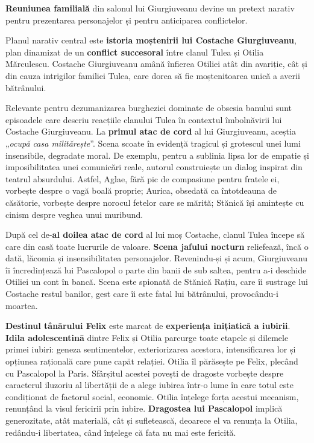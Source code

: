 \documentclass{article}
\newcommand{\qu}[1]{„\emph{#1}”}
\begin{document}
\textbf{Reuniunea familială} din salonul lui Giurgiuveanu devine un pretext narativ pentru prezentarea personajelor și pentru anticiparea conflictelor.

Planul narativ central este \textbf{istoria moștenirii lui Costache Giurgiuveanu}, plan dinamizat de un \textbf{conflict succesoral} între clanul Tulea și Otilia Mărculescu. Costache Giurgiuveanu amână înfierea Otiliei atât din avariție, cât și din cauza intrigilor familiei Tulea, care dorea să fie moștenitoarea unică a averii bătrânului.

Relevante pentru dezumanizarea burgheziei dominate de obsesia banului sunt episoadele care descriu reacțiile clanului Tulea în contextul îmbolnăvirii lui Costache Giurgiuveanu. La \textbf{primul atac de cord} al lui Giurgiuveanu, aceștia \qu{ocupă casa militărește}. Scena scoate în evidență tragicul și grotescul unei lumi insensibile, degradate moral. De exemplu, pentru a sublinia lipsa lor de empatie și imposibilitatea unei comunicări reale, autorul construiește un dialog inspirat din teatrul absurdului. Astfel, Aglae, fără pic de compasiune pentru fratele ei, vorbește despre o vagă boală proprie; Aurica, obsedată ca întotdeauna de căsătorie, vorbește despre norocul fetelor care se mărită; Stănică își amintește cu cinism despre veghea unui muribund.

După cel de-\textbf{al doilea atac de cord} al lui moș Costache, clanul Tulea începe să care din casă toate lucrurile de valoare. \textbf{Scena jafului nocturn} reliefează, încă o dată, lăcomia și insensibilitatea personajelor. Revenindu-și și acum, Giurgiuveanu îi încredințează lui Pascalopol o parte din banii de sub saltea, pentru a-i deschide Otiliei un cont în bancă. Scena este spionată de Stănică Rațiu, care îi sustrage lui Costache restul banilor, gest care îi este fatal lui bătrânului, provocându-i moartea.

\textbf{Destinul tânărului Felix} este marcat de \textbf{experiența inițiatică a iubirii}. \textbf{Idila adolescentină} dintre Felix și Otilia parcurge toate etapele și dilemele primei iubiri: geneza sentimentelor, exteriorizarea acestora, intensificarea lor și opțiunea rațională care pune capăt relației. Otilia îl părăsește pe Felix, plecând cu Pascalopol la Paris. Sfârșitul acestei povești de dragoste vorbește despre caracterul iluzoriu al libertății de a alege iubirea într-o lume în care totul este condiționat de factorul social, economic. Otilia înțelege forța acestui mecanism, renunțând la visul fericirii prin iubire. \textbf{Dragostea lui Pascalopol} implică generozitate, atât materială, cât și sufletească, deoarece el va renunța la Otilia, redându-i libertatea, când înțelege că fata nu mai este fericită.
\end{document}
